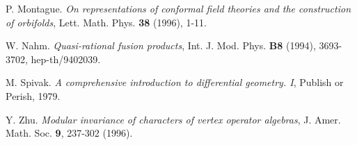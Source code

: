 \documentclass[a4paper,12pt]{article}
\newcommand{\ti}[1]{\textit{#1}}
\begin{document}
\begin{thebibliography}{99}
 P. Montague.  \ti{On representations of conformal field theories and the construction of orbifolds}, Lett. Math. Phys. \textbf{38} (1996), 1-11.

 W. Nahm.  \ti{Quasi-rational fusion products}, Int. J. Mod. Phys. \textbf{B8} (1994), 3693-3702, hep-th/9402039.

 M. Spivak.  \ti{A comprehensive introduction to differential geometry. I}, Publish or Perish, 1979. 

 Y. Zhu.  \ti{Modular invariance of characters of vertex operator algebras}, J. Amer. Math. Soc. \textbf{9}, 237-302 (1996).

\end{thebibliography}
\end{document}
